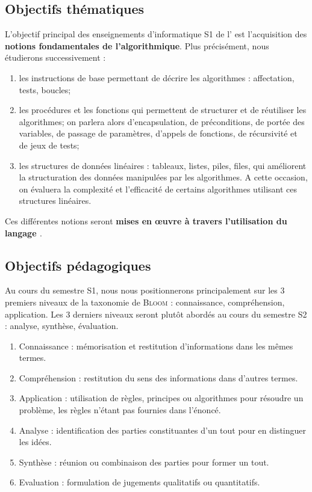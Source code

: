 \documentclass[11pt,a4paper,colorlinks,breaklinks]{article}
\begin{document}
\subsection{Objectifs thématiques}
L'objectif principal des enseignements d'informatique S1 de l'\enib{}
est l'acquisition des \textbf{notions fondamentales de l'algorithmique}.
Plus précisément, nous étudierons successivement :
\begin{enumerate}
\item les instructions de base permettant de décrire les algorithmes : affectation, tests, boucles;
\item les procédures et les fonctions qui permettent de structurer et de réutiliser les algorithmes;
	on parlera alors d'encapsulation, de préconditions, de portée des variables, de passage de paramètres,
	d'appels de fonctions, de récursivité et de jeux de tests;
\item les structures de données linéaires : tableaux, listes, piles, files, qui améliorent la
	structuration des données manipulées par les algorithmes. A cette occasion, on évaluera
	la complexité et l'efficacité de certains algorithmes utilisant ces structures linéaires.
\end{enumerate}
Ces différentes notions seront \textbf{mises en \oe uvre à travers l'utilisation du 
langage \href{http://www.python.org/}{\python}}.



\subsection{Objectifs pédagogiques}
Au cours du semestre S1, nous nous positionnerons principalement sur les 3 premiers 
niveaux de la taxonomie de \textsc{Bloom} : connaissance, compréhension, application. 
Les 3 derniers niveaux seront plutôt abordés au cours 
du semestre S2 : analyse, synthèse, évaluation.
\begin{enumerate}
\item Connaissance : mémorisation et restitution d'informations dans les mêmes termes.
\item Compréhension : restitution du sens des informations dans d'autres termes.
\item Application : utilisation de règles, principes ou algorithmes pour résoudre un problème, 
	les règles n'étant pas fournies dans l'énoncé.
\item Analyse : identification des parties constituantes d'un tout pour en distinguer les idées.
\item Synthèse : réunion ou combinaison des parties pour former un tout.
\item Evaluation : formulation de jugements qualitatifs ou quantitatifs.
\end{enumerate}
\end{document}

